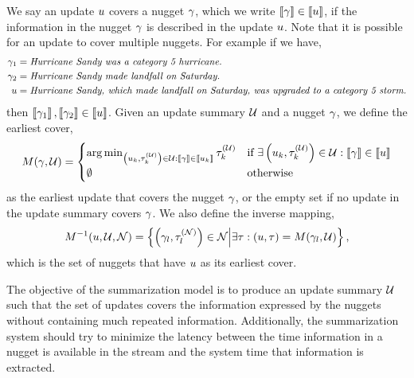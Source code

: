 We say an update $u$ covers a nugget $\gamma$, which we write
$\left\llbracket \gamma \right\rrbracket \in \left\llbracket u \right\rrbracket$, if the information in the nugget
$\gamma$ is described in the update $u$. Note that it is possible for
an update to cover multiple nuggets.  For example if we have,
\begin{align*}
    \gamma_1 & =  \textit{Hurricane Sandy was a category 5 hurricane.}\\
\gamma_2 & = \textit{Hurricane Sandy made landfall on Saturday.}\\
u & = \textit{Hurricane Sandy, which made landfall on Saturday,
                was upgraded to a category 5 storm.}
\end{align*}
then $\left\llbracket \gamma_1 \right\rrbracket,\left\llbracket \gamma_2 \right\rrbracket \in \left\llbracket u \right\rrbracket$. Given
an update summary $\mathcal{U}$ and a nugget $\gamma$, we define the
earliest cover, 
\[
    M(\gamma,\mathcal{U}) = 
   \begin{cases} 
\operatorname*{arg\,min}_{\left(u_{k},\tau^{(\mathcal{U})}_{k}\right) \in \mathcal{U} : \left\llbracket \gamma \right\rrbracket \in \left\llbracket u_k \right\rrbracket} 
  \tau^{(\mathcal{U})}_k &
\textrm{if $\exists \left(u_{k},\tau^{(\mathcal{U})}_{k}\right) \in \mathcal{U}: 
            \left\llbracket \gamma \right\rrbracket \in \left\llbracket u \right\rrbracket$} \\ 
            \emptyset & \textrm{otherwise} 
    \end{cases}
\] 
as the earliest update that covers the nugget $\gamma$, or the empty set if
no update in the update summary covers $\gamma$. We also define the inverse
mapping,
\[
    M^{-1}(u, \mathcal{U}, \mathcal{N}) =
    \left\{\left(\gamma_{l},\tau^{(\mathcal{N})}_{l}\right) \in \mathcal{N} \Big\vert \exists\tau : \left(u,\tau\right) = M(\gamma_l,
\mathcal{U}) \right\},
\] 
which is the set of nuggets that have $u$ as its earliest cover.

The objective of the summarization model is to produce an update summary
$\mathcal{U}$ such that the set of updates covers the information expressed
by the nuggets without containing much repeated information. Additionally, the
summarization system should try to minimize the latency between the time
information in a nugget is available in the stream and the system time that
information is extracted. 

